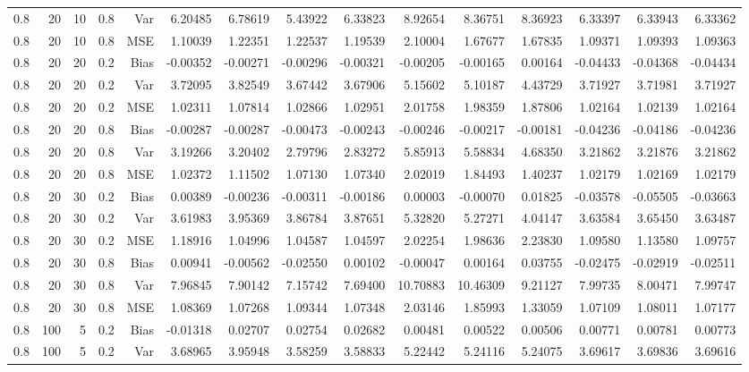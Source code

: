 \begin{table}[!htbp]
\begin{tabular}{lrrrrrrrrrrrrrr}
0.8 &  20 & 10 & 0.8 & Var & 6.20485 & 6.78619 & 5.43922 & 6.33823 & 8.92654 & 8.36751 & 8.36923 & 6.33397 & 6.33943 & 6.33362 \\
0.8 &  20 & 10 & 0.8 & MSE & 1.10039 & 1.22351 & 1.22537 & 1.19539 & 2.10004 & 1.67677 & 1.67835 & 1.09371 & 1.09393 & 1.09363 \\
0.8 &  20 & 20 & 0.2 & Bias & -0.00352 & -0.00271 & -0.00296 & -0.00321 & -0.00205 & -0.00165 & 0.00164 & -0.04433 & -0.04368 & -0.04434 \\
0.8 &  20 & 20 & 0.2 & Var & 3.72095 & 3.82549 & 3.67442 & 3.67906 & 5.15602 & 5.10187 & 4.43729 & 3.71927 & 3.71981 & 3.71927 \\
0.8 &  20 & 20 & 0.2 & MSE & 1.02311 & 1.07814 & 1.02866 & 1.02951 & 2.01758 & 1.98359 & 1.87806 & 1.02164 & 1.02139 & 1.02164 \\
0.8 &  20 & 20 & 0.8 & Bias & -0.00287 & -0.00287 & -0.00473 & -0.00243 & -0.00246 & -0.00217 & -0.00181 & -0.04236 & -0.04186 & -0.04236 \\
0.8 &  20 & 20 & 0.8 & Var & 3.19266 & 3.20402 & 2.79796 & 2.83272 & 5.85913 & 5.58834 & 4.68350 & 3.21862 & 3.21876 & 3.21862 \\
0.8 &  20 & 20 & 0.8 & MSE & 1.02372 & 1.11502 & 1.07130 & 1.07340 & 2.02019 & 1.84493 & 1.40237 & 1.02179 & 1.02169 & 1.02179 \\
0.8 &  20 & 30 & 0.2 & Bias & 0.00389 & -0.00236 & -0.00311 & -0.00186 & 0.00003 & -0.00070 & 0.01825 & -0.03578 & -0.05505 & -0.03663 \\
0.8 &  20 & 30 & 0.2 & Var & 3.61983 & 3.95369 & 3.86784 & 3.87651 & 5.32820 & 5.27271 & 4.04147 & 3.63584 & 3.65450 & 3.63487 \\
0.8 &  20 & 30 & 0.2 & MSE & 1.18916 & 1.04996 & 1.04587 & 1.04597 & 2.02254 & 1.98636 & 2.23830 & 1.09580 & 1.13580 & 1.09757 \\
0.8 &  20 & 30 & 0.8 & Bias & 0.00941 & -0.00562 & -0.02550 & 0.00102 & -0.00047 & 0.00164 & 0.03755 & -0.02475 & -0.02919 & -0.02511 \\
0.8 &  20 & 30 & 0.8 & Var & 7.96845 & 7.90142 & 7.15742 & 7.69400 & 10.70883 & 10.46309 & 9.21127 & 7.99735 & 8.00471 & 7.99747 \\
0.8 &  20 & 30 & 0.8 & MSE & 1.08369 & 1.07268 & 1.09344 & 1.07348 & 2.03146 & 1.85993 & 1.33059 & 1.07109 & 1.08011 & 1.07177 \\
0.8 & 100 &  5 & 0.2 & Bias & -0.01318 & 0.02707 & 0.02754 & 0.02682 & 0.00481 & 0.00522 & 0.00506 & 0.00771 & 0.00781 & 0.00773 \\
0.8 & 100 &  5 & 0.2 & Var & 3.68965 & 3.95948 & 3.58259 & 3.58833 & 5.22442 & 5.24116 & 5.24075 & 3.69617 & 3.69836 & 3.69616 \\

\end{tabular}
\end{table}
